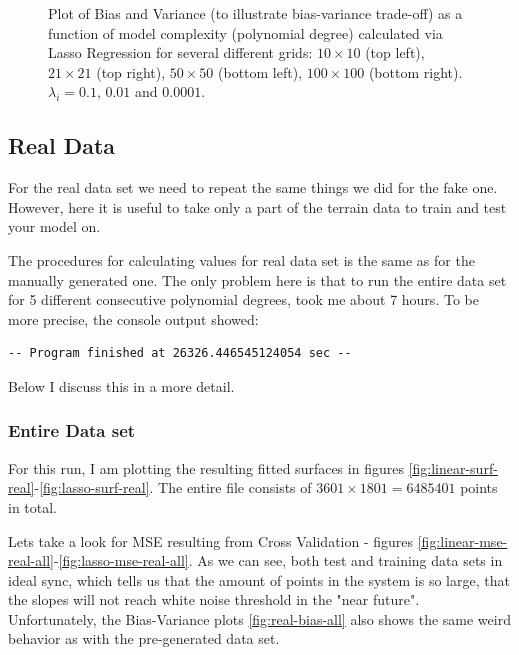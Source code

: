 \begin{figure}[!ht]
\begin{subfigure}{\textwidth}
\end{subfigure}
\caption{Plot of Bias and Variance (to illustrate bias-variance trade-off) as a function of model complexity (polynomial degree) calculated via Lasso Regression for several different grids: $10\times10$ (top left), $21\times21$ (top right), $50\times50$ (bottom left), $100\times100$ (bottom right). $\lambda_i = 0.1$, $0.01$ and $0.0001$.}
\label{fig:lasso-bias}
\end{figure}


 \subsection{Real Data}
 
For the real data set we need to repeat the same things we did for the fake one. However, here it is useful to take only a part of the terrain data to train and test your model on.
 
 The procedures for calculating values for real data set is the same as for the manually generated one. The only problem here is that to run the entire data set for 5 different consecutive polynomial degrees, took me about 7 hours. To be more precise, the console output showed:
 \begin{lstlisting}
-- Program finished at 26326.446545124054 sec --
\end{lstlisting}
Below I discuss this in a more detail.

\subsubsection{Entire Data set}

For this run, I am plotting the resulting fitted surfaces in figures \ref{fig:linear-surf-real}-\ref{fig:lasso-surf-real}. The entire file consists of $3601\times1801 = 6485401$ points in total. %

Lets take a look for MSE resulting from Cross Validation - figures \ref{fig:linear-mse-real-all}-\ref{fig:lasso-mse-real-all}. As we can see, both test and training data sets in ideal sync, which tells us that the amount of points in the system is so large, that the slopes will not reach white noise threshold in the "near future".
Unfortunately, the Bias-Variance plots \ref{fig:real-bias-all} also shows the same weird behavior as with the pre-generated data set.

